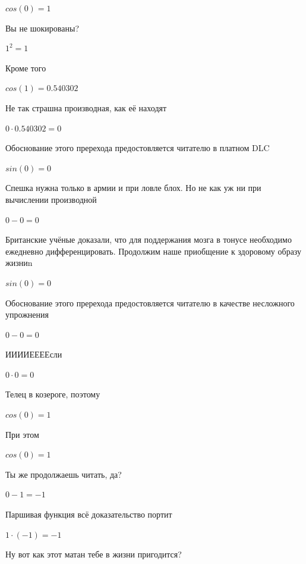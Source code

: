 \documentclass[12pt,a4paper,fleqn]{article}
\begin{document}
\begin{center}$cos(0) = 1$\end{center}
Вы не шокированы?\cite{link3}

\begin{center}$1^{2} = 1$\end{center}
Кроме того

\begin{center}$cos(1) = 0.540302$\end{center}
Не так страшна производная, как её находят\cite{link2}

\begin{center}$0 \cdot 0.540302 = 0$\end{center}
Обоснование этого пререхода предостовляется читателю в платном DLC

\begin{center}$sin(0) = 0$\end{center}
Спешка нужна только в армии и при ловле блох. Но не как уж ни при вычислении производной\cite{link2}

\begin{center}$0-0 = 0$\end{center}
Британские учёные доказали, что для поддержания мозга в тонусе необходимо ежедневно дифференцировать. Продолжим наше приобщение к здоровому образу жизниn

\begin{center}$sin(0) = 0$\end{center}
Обоснование этого пререхода предостовляется читателю в качестве несложного упрожнения

\begin{center}$0-0 = 0$\end{center}
ИИИИЕЕЕЕсли\cite{link3}

\begin{center}$0 \cdot 0 = 0$\end{center}
Телец в козероге, поэтому

\begin{center}$cos(0) = 1$\end{center}
При этом

\begin{center}$cos(0) = 1$\end{center}
Ты же продолжаешь читать, да?

\begin{center}$0-1 = -1$\end{center}
Паршивая функция всё доказательство портит\cite{link2}

\begin{center}$1 \cdot (-1) = -1$\end{center}
Ну вот как этот матан тебе в жизни пригодится?
\end{document}
